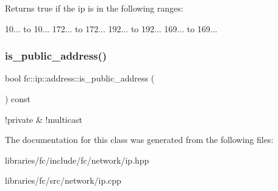 \begin{DoxyReturn}{Returns}
true if the ip is in the following ranges\+:
\end{DoxyReturn}
10... to 10... 172... to 172... 192... to 192... 169... to 169... \mbox{\label{classfc_1_1ip_1_1address_a1481a21df38961dfc3c7eea41b1f79a7}} 
\subsubsection{\texorpdfstring{is\+\_\+public\+\_\+address()}{is\_public\_address()}}
{\footnotesize\ttfamily bool fc\+::ip\+::address\+::is\+\_\+public\+\_\+address (\begin{DoxyParamCaption}{ }\end{DoxyParamCaption}) const}

!private \& !multicast 

The documentation for this class was generated from the following files\+:\begin{DoxyCompactItemize}
\item 
libraries/fc/include/fc/network/ip.\+hpp\item 
libraries/fc/src/network/ip.\+cpp\end{DoxyCompactItemize}
